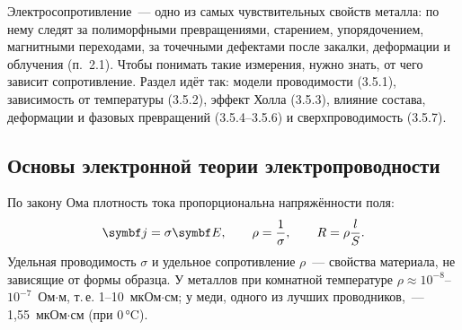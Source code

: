 \begin{orientir}
Электросопротивление~— одно из самых чувствительных свойств металла:
по нему следят за полиморфными превращениями, старением, упорядочением,
магнитными переходами, за точечными дефектами после закалки,
деформации и облучения (п.~2.1). Чтобы понимать такие измерения, нужно
знать, от чего зависит сопротивление. Раздел идёт так: модели
проводимости (3.5.1), зависимость от температуры (3.5.2), эффект Холла
(3.5.3), влияние состава, деформации и фазовых превращений
(3.5.4--3.5.6) и сверхпроводимость (3.5.7).
\end{orientir}

\subsection{Основы электронной теории электропроводности}\label{ssec:conduct}

По закону Ома плотность тока пропорциональна напряжённости поля:
\begin{equation}\label{eq:ohm}
\vb j=\sigma\vb E ,\qquad \rho=\frac1\sigma ,\qquad R=\rho\frac lS .
\end{equation}
Удельная проводимость $\sigma$ и удельное сопротивление $\rho$~—
свойства материала, не зависящие от формы образца. У металлов при
комнатной температуре $\rho\approx10^{-8}$--$10^{-7}$~Ом$\cdot$м, т.\,е.
1--10~мкОм$\cdot$см; у меди, одного из лучших проводников,~—
1,55~мкОм$\cdot$см (при 0\,°C).

